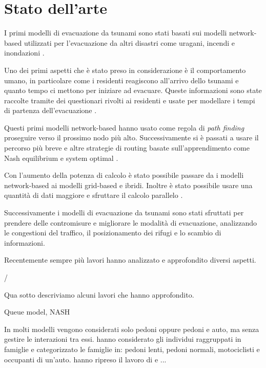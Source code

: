 \section{Stato dell'arte}
I primi modelli di evacuazione da tsunami sono stati basati sui modelli network-based utilizzati per l'evacuazione da altri disastri come
uragani, incendi e inondazioni \parencite{usuzawa1997development, imamura2001development}.

Uno dei primi aspetti che è stato preso in considerazione è il comportamento umano,
in particolare come i residenti reagiscono all'arrivo dello tsunami
e quanto tempo ci mettono per iniziare ad evacuare.
%
Queste informazioni sono state raccolte tramite dei questionari rivolti ai residenti
e usate per modellare i tempi di partenza dell'evacuazione \parencite{imamura2001development, saito2004simulation}.

Questi primi modelli network-based hanno usato come regola di \textit{path finding}
proseguire verso il prossimo nodo più alto. Successivamente si è passati a usare il percorso
più breve \parencite{katada2004disaster} e altre strategie di routing basate sull'apprendimento come Nash equilibrium e system optimal \parencite{lammel2009towards}.

\vspace*{4mm}
Con l'aumento della potenza di calcolo è stato possibile passare da i modelli network-based ai modelli grid-based e ibridi.
Inoltre è stato possibile usare una quantità di dati maggiore e sfruttare il calcolo parallelo \parencite{wijerathne2013hpc, makinoshima2018enhancing}.

\vspace*{4mm}
Successivamente i modelli di evacuazione da tsunami sono stati sfruttati per prendere delle contromisure e migliorare le modalità di evacuazione,
analizzando le congestioni del traffico, il posizionamento dei rifugi e lo scambio di informazioni.


\newpage
\noindent
Recentemente sempre più lavori hanno analizzato e approfondito diversi aspetti.

/

\noindent
Qua sotto descriviamo alcuni lavori che hanno approfondito.

\vspace*{4mm}
\textbf{\textcite{lammel2010emergency}} Queue model, NASH

In molti modelli vengono considerati solo pedoni oppure pedoni e auto, ma senza gestire le interazioni tra essi.
\textcite{goto2012tsunami} hanno considerato gli individui raggruppati in famiglie e categorizzato le famiglie in:
pedoni lenti, pedoni normali, motociclisti e occupanti di un'auto.
\textcite{wang2021novel} hanno ripreso il lavoro di \textcite{goto2012tsunami} e ...

